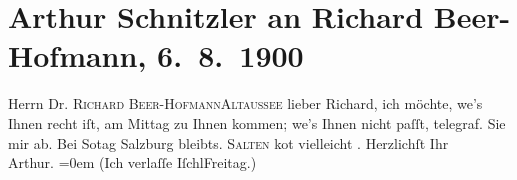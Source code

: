 

         
         \renewcommand{\erwaehntePersonen}{Personen: Richard Beer-Hofmann, Felix Salten}
         \renewcommand{\erwaehnteOrte}{Orte: Altaussee, Bad Ischl, Salzburg, Schruns}
         \renewcommand{\erwaehnteWerke}{}
               \section[Arthur Schnitzler an Richard Beer-Hofmann, 6. 8. 1900]{ Arthur Schnitzler an Richard Beer-Hofmann, 6. 8. 1900}\nopagebreak{}\rehead{ }\begin{ledgroupsized}[t]{13cm}\normalsize\beginnumbering \toendnotes[C]{\smallbreak\pagebreak[2]} 
\toendnotes[C]{\smallbreak}\pstart{}{\pb}Herrn Dr. \textsc{Richard
                     Beer-Hofmann}\pend{}\pstart{}\textsc{Altaussee}\pend{}{\bigskip}\pstart
           \noindent{}{\pb}lieber Richard, ich möchte, we{\geminationn}’s Ihnen
               recht iſt, am \label{K_L01067-1v}\label{K_L01067-1h}{ }Mittag zu Ihnen kommen; we{\geminationn}’s Ihnen nicht
               paſſt, telegraf. Sie mir ab. Bei So{\geminationn}tag{ }Salzburg bleibts. \textsc{Salten} ko{\geminationm}t vielleicht \label{K_L01067-11v}\label{K_L01067-11h}.\pend
           \pstart
           Herzlichſt Ihr{\\[\baselineskip]}\spacefill\mbox{Arthur.}\pend
           \leftskip=0em{}\pstart
           \noindent{}(Ich verlaſſe IſchlFreitag.)\pend
           
         
         \endnumbering{}\end{ledgroupsized}  \newcommand{\dateiname}{L01067}\newcommand{\titel}{Arthur Schnitzler an Richard Beer-Hofmann, 6. 8. 1900}\newcommand{\editorInnen}{Martin Anton Müller und Gerd-Hermann Susen}
      